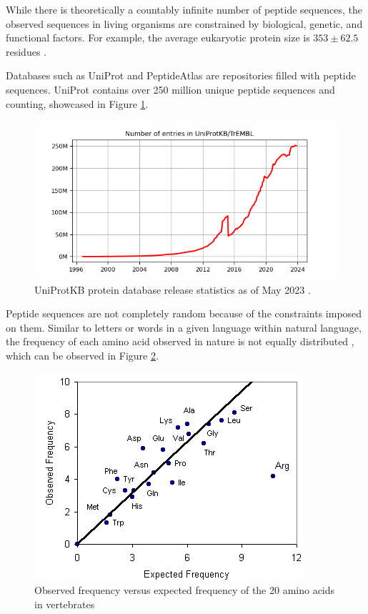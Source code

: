 While there is theoretically a countably infinite number of \gls{peptide} sequences, the observed sequences in living organisms are constrained by biological, genetic, and functional factors. For example, the average eukaryotic protein size is \(353 \pm 62.5\) \glspl{residue} \cite{Nevers:2023}. 

Databases such as UniProt \cite{UniProt:2023} and PeptideAtlas \cite{PeptideAtlas:2006} are repositories filled with \gls{peptide} sequences. UniProt contains over 250 million unique peptide sequences and counting, showcased in Figure \ref{fig:uniprot}.

\begin{figure}
    \begin{center}
	   \includegraphics[width=0.75\linewidth]{figures/uniprot.png}
    \end{center}
    \caption{UniProtKB protein database release statistics as of May 2023 \cite{UniProt:2023}.}
    \label{fig:uniprot}
\end{figure}

Peptide sequences are not completely random because of the constraints imposed on them. Similar to letters or words in a given language within natural language, the frequency of each amino acid observed in nature is not equally distributed \cite{Beals:1999}, which can be observed in Figure \ref{fig:aafreq}.

\begin{figure}
    \begin{center}
	   \includegraphics[width=0.5\linewidth]{figures/aafreq.png}
    \end{center}
    \caption{Observed frequency versus expected frequency of the 20 amino acids in vertebrates \cite{Beals:1999}}
    \label{fig:aafreq}
\end{figure}

